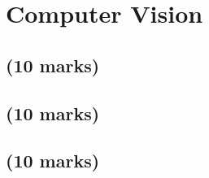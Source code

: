 \section{Computer Vision}

\subsection{(10 marks)}


\subsection{(10 marks)}


\subsection{(10 marks)}

\newpage

